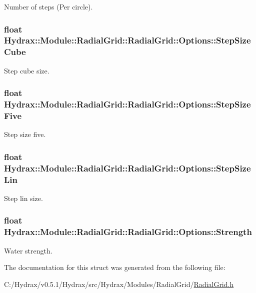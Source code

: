 Number of steps (Per circle). 

\hypertarget{struct_hydrax_1_1_module_1_1_radial_grid_1_1_options_e405499a76f4c1805c559901fbdad2cd}{
\subsubsection[{StepSizeCube}]{\setlength{\rightskip}{0pt plus 5cm}float Hydrax::Module::RadialGrid::RadialGrid::Options::StepSizeCube}}
\label{struct_hydrax_1_1_module_1_1_radial_grid_1_1_options_e405499a76f4c1805c559901fbdad2cd}


Step cube size. 

\hypertarget{struct_hydrax_1_1_module_1_1_radial_grid_1_1_options_fb39f5d35557b182254e6685251b17df}{
\subsubsection[{StepSizeFive}]{\setlength{\rightskip}{0pt plus 5cm}float Hydrax::Module::RadialGrid::RadialGrid::Options::StepSizeFive}}
\label{struct_hydrax_1_1_module_1_1_radial_grid_1_1_options_fb39f5d35557b182254e6685251b17df}


Step size five. 

\hypertarget{struct_hydrax_1_1_module_1_1_radial_grid_1_1_options_933a688b6f7230ad6ff130298edbb795}{
\subsubsection[{StepSizeLin}]{\setlength{\rightskip}{0pt plus 5cm}float Hydrax::Module::RadialGrid::RadialGrid::Options::StepSizeLin}}
\label{struct_hydrax_1_1_module_1_1_radial_grid_1_1_options_933a688b6f7230ad6ff130298edbb795}


Step lin size. 

\hypertarget{struct_hydrax_1_1_module_1_1_radial_grid_1_1_options_8f11d4879ffadedf6c1ba0519e0bbbfc}{
\subsubsection[{Strength}]{\setlength{\rightskip}{0pt plus 5cm}float Hydrax::Module::RadialGrid::RadialGrid::Options::Strength}}
\label{struct_hydrax_1_1_module_1_1_radial_grid_1_1_options_8f11d4879ffadedf6c1ba0519e0bbbfc}


Water strength. 



The documentation for this struct was generated from the following file:\begin{CompactItemize}
\item 
C:/Hydrax/v0.5.1/Hydrax/src/Hydrax/Modules/RadialGrid/\hyperlink{_radial_grid_8h}{RadialGrid.h}\end{CompactItemize}
